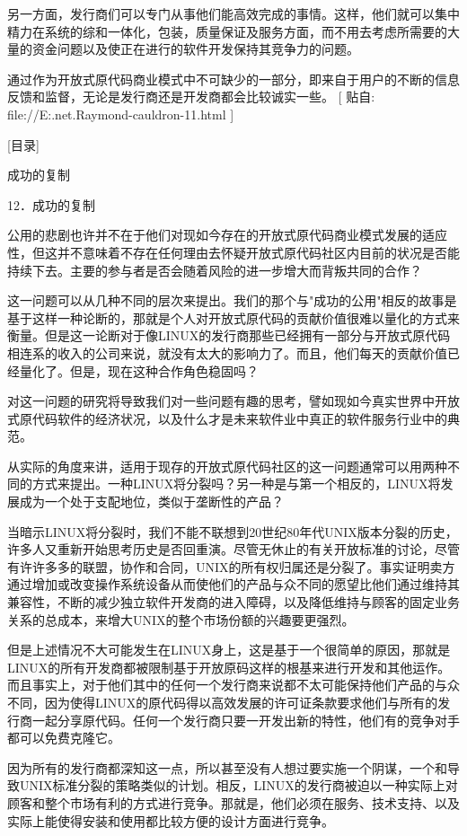 \documentclass[a4paper,12pt,UTF8,twoside]{ctexbook}
\begin{document}
另一方面，发行商们可以专门从事他们能高效完成的事情。这样，他们就可以集中精力在系统的综和一体化，包装，质量保证及服务方面，而不用去考虑所需要的大量的资金问题以及使正在进行的软件开发保持其竞争力的问题。


通过作为开放式原代码商业模式中不可缺少的一部分，即来自于用户的不断的信息反馈和监督，无论是发行商还是开发商都会比较诚实一些。
[ 贴自: file://E:\joyfire\joyfire.net\bible\Eric.Raymond\magic-cauldron-11.html ]

[目录]

成功的复制

12．成功的复制

公用的悲剧也许并不在于他们对现如今存在的开放式原代码商业模式发展的适应性，但这并不意味着不存在任何理由去怀疑开放式原代码社区内目前的状况是否能持续下去。主要的参与者是否会随着风险的进一步增大而背叛共同的合作？


这一问题可以从几种不同的层次来提出。我们的那个与"成功的公用"相反的故事是基于这样一种论断的，那就是个人对开放式原代码的贡献价值很难以量化的方式来衡量。但是这一论断对于像LINUX的发行商那些已经拥有一部分与开放式原代码相连系的收入的公司来说，就没有太大的影响力了。而且，他们每天的贡献价值已经量化了。但是，现在这种合作角色稳固吗？


对这一问题的研究将导致我们对一些问题有趣的思考，譬如现如今真实世界中开放式原代码软件的经济状况，以及什么才是未来软件业中真正的软件服务行业中的典范。


从实际的角度来讲，适用于现存的开放式原代码社区的这一问题通常可以用两种不同的方式来提出。一种LINUX将分裂吗？另一种是与第一个相反的，LINUX将发展成为一个处于支配地位，类似于垄断性的产品？


当暗示LINUX将分裂时，我们不能不联想到20世纪80年代UNIX版本分裂的历史，许多人又重新开始思考历史是否回重演。尽管无休止的有关开放标准的讨论，尽管有许许多多的联盟，协作和合同，UNIX的所有权归属还是分裂了。事实证明卖方通过增加或改变操作系统设备从而使他们的产品与众不同的愿望比他们通过维持其兼容性，不断的减少独立软件开发商的进入障碍，以及降低维持与顾客的固定业务关系的总成本，来增大UNIX的整个市场份额的兴趣要更强烈。


但是上述情况不大可能发生在LINUX身上，这是基于一个很简单的原因，那就是LINUX的所有开发商都被限制基于开放原码这样的根基来进行开发和其他运作。而且事实上，对于他们其中的任何一个发行商来说都不太可能保持他们产品的与众不同，因为使得LINUX的原代码得以高效发展的许可证条款要求他们与所有的发行商一起分享原代码。任何一个发行商只要一开发出新的特性，他们有的竞争对手都可以免费克隆它。


因为所有的发行商都深知这一点，所以甚至没有人想过要实施一个阴谋，一个和导致UNIX标准分裂的策略类似的计划。相反，LINUX的发行商被迫以一种实际上对顾客和整个市场有利的方式进行竞争。那就是，他们必须在服务、技术支持、以及实际上能使得安装和使用都比较方便的设计方面进行竞争。
\end{document}
